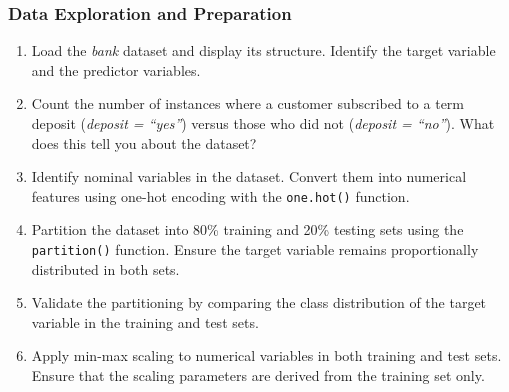 \documentclass[
  11pt,
]{book}
\makeatletter
\newenvironment{Shaded}{}{}
\newcommand{\DecValTok}[1]{#1}
\newcommand{\NormalTok}[1]{#1}
\newcommand{\SpecialCharTok}[1]{\textcolor[rgb]{0.39,0.39,0.39}{#1}}
\newcommand{\StringTok}[1]{\textcolor[rgb]{0.39,0.39,0.39}{#1}}
\providecommand{\tightlist}{%
  \setlength{\itemsep}{0pt}\setlength{\parskip}{0pt}}
\newenvironment{kframe}{%
\medskip{}
\setlength{\fboxsep}{.8em}
 \def\at@end@of@kframe{}%
 \ifinner\ifhmode%
  \def\at@end@of@kframe{\end{minipage}}%
  \begin{minipage}{\columnwidth}%
 \fi\fi%
 \def\FrameCommand##1{\hskip\@totalleftmargin \hskip-\fboxsep
 \colorbox{shadecolor}{##1}\hskip-\fboxsep
     \hskip-\linewidth \hskip-\@totalleftmargin \hskip\columnwidth}%
 \MakeFramed {\advance\hsize-\width
   \@totalleftmargin\z@ \linewidth\hsize
   \@setminipage}}%
 {\par\unskip\endMakeFramed%
 \at@end@of@kframe}
\renewenvironment{Shaded}{\begin{kframe}}{\end{kframe}}
\theoremstyle{definition}
\theoremstyle{definition}
\theoremstyle{definition}
\theoremstyle{definition}
\theoremstyle{remark}
\makeatother
\begin{document}
\begin{Shaded}
\end{Shaded}

\subsubsection*{Data Exploration and Preparation}\label{data-exploration-and-preparation}


\begin{enumerate}
\def\labelenumi{\arabic{enumi}.}
\setcounter{enumi}{10}
\tightlist
\item
  Load the \emph{bank} dataset and display its structure. Identify the target variable and the predictor variables.\\
\item
  Count the number of instances where a customer subscribed to a term deposit (\emph{deposit = ``yes''}) versus those who did not (\emph{deposit = ``no''}). What does this tell you about the dataset?\\
\item
  Identify nominal variables in the dataset. Convert them into numerical features using one-hot encoding with the \texttt{one.hot()} function.\\
\item
  Partition the dataset into 80\% training and 20\% testing sets using the \texttt{partition()} function. Ensure the target variable remains proportionally distributed in both sets.\\
\item
  Validate the partitioning by comparing the class distribution of the target variable in the training and test sets.\\
\item
  Apply min-max scaling to numerical variables in both training and test sets. Ensure that the scaling parameters are derived from the training set only.
\end{enumerate}
\end{document}
